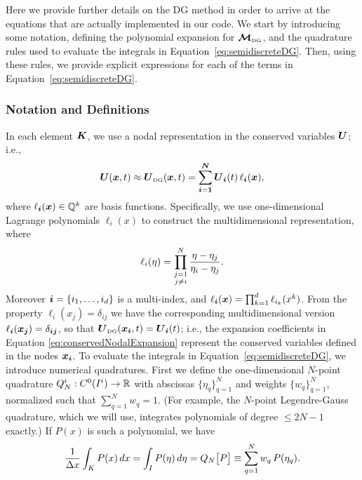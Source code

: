 \documentclass[10pt,preprint]{aastex}
\begin{document}
Here we provide further details on the DG method in order to arrive at the equations that are actually implemented in our code.  
We start by introducing some notation, defining the polynomial expansion for $\boldsymbol{\mathcal{M}}_{\mbox{\tiny DG}}$, and the quadrature rules used to evaluate the integrals in Equation~\eqref{eq:semidiscreteDG}.  
Then, using these rules, we provide explicit expressions for each of the terms in Equation~\eqref{eq:semidiscreteDG}.  

\subsubsection{Notation and Definitions}

In each element $\boldsymbol{K}$, we use a nodal representation in the conserved variables $\boldsymbol{U}$; i.e.,
\begin{equation}
  \boldsymbol{U}(\boldsymbol{x},t)\approx
  \boldsymbol{U}_{\mbox{\tiny DG}}(\boldsymbol{x},t)=\sum_{\boldsymbol{i}=\boldsymbol{1}}^{\boldsymbol{N}}\boldsymbol{U}_{\boldsymbol{i}}(t)\,\ell_{\boldsymbol{i}}(\boldsymbol{x}),
  \label{eq:conservedNodalExpansion}
\end{equation}
where $\ell_{\boldsymbol{i}}(\boldsymbol{x})\in\mathbb{Q}^{k}$ are basis functions.  
Specifically, we use one-dimensional Lagrange polynomials $\ell_{i}(x)$ to construct the multidimensional representation, where
\begin{equation}
  \ell_{i}(\eta)=
  \prod_{\substack{j=1\\j\ne i}}^{N}\frac{\eta-\eta_{j}}{\eta_{i}-\eta_{j}}.  
\end{equation}
Moreover $\boldsymbol{i}=\{i_{1},\ldots,i_{d}\}$ is a multi-index, and $\ell_{\boldsymbol{i}}(\boldsymbol{x})=\prod_{k=1}^{d}\ell_{i_{k}}(x^{k})$.  
From the property $\ell_{i}(x_{j})=\delta_{ij}$ we have the corresponding multidimensional version $\ell_{\boldsymbol{i}}(\boldsymbol{x}_{\boldsymbol{j}})=\delta_{\boldsymbol{i}\boldsymbol{j}}$, so that $\boldsymbol{U}_{\mbox{\tiny DG}}(\boldsymbol{x}_{\boldsymbol{i}},t)=\boldsymbol{U}_{\boldsymbol{i}}(t)$; i.e., the expansion coefficients in Equation \eqref{eq:conservedNodalExpansion} represent the conserved variables defined in the nodes $\boldsymbol{x}_{\boldsymbol{i}}$.  
To evaluate the integrals in Equation~\eqref{eq:semidiscreteDG}, we introduce numerical quadratures.  
First we define the one-dimensional $N$-point quadrature $Q_{N}^{i}:C^{0}(I^{i})\to\mathbb{R}$ with abscissas $\{\eta_{q}\}_{q=1}^{N}$ and weights $\{w_{q}\}_{q=1}^{N}$, normalized such that $\sum_{q=1}^{N}w_{q}=1$.  
(For example, the $N$-point Legendre-Gauss quadrature, which we will use, integrates polynomials of degree $\le 2N-1$ exactly.)
If $P(x)$ is such a polynomial, we have
\begin{equation}
  \frac{1}{\Delta x}\int_{K}P(x)\,dx=\int_{I}P(\eta)\,d\eta=Q_{N}\big[P\big]\equiv\sum_{q=1}^{N}w_{q}\,P(\eta_{q}).  
\end{equation}
\end{document}
